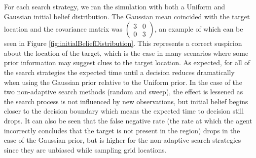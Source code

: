 For each search strategy, we ran the simulation with both a Uniform and Gaussian initial belief distribution. The Gaussian mean coincided with the target location and the covariance matrix was $\begin{pmatrix} 3 & 0\\ 0 & 3\end{pmatrix}$, an example of which can be seen in Figure \ref{fig:initialBeliefDistribution}. This represents a correct suspicion about the location of the target, which is the case in many scenarios where some prior information may suggest clues to the target location. As expected, for all of the search strategies the expected time until a decision reduces dramatically when using the Gaussian prior relative to the Uniform prior. In the case of the two non-adaptive search methods (random and sweep), the effect is lessened as the search process is not influenced by new observations, but initial belief begins closer to the decision boundary which means the expected time to decision still drops. It can also be seen that the false negative rate (the rate at which the agent incorrectly concludes that the target is not present in the region) drops in the case of the Gaussian prior, but is higher for the non-adaptive search strategies since they are unbiased while sampling grid locations.
   



